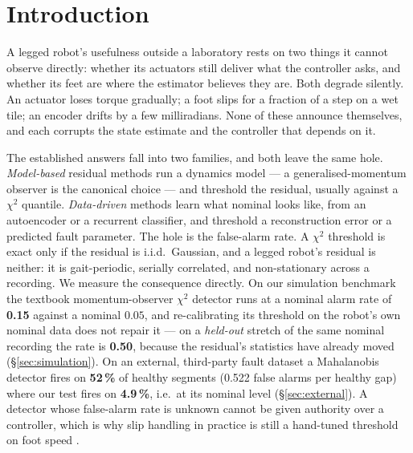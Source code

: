 \section{Introduction}
\label{sec:intro}

A legged robot's usefulness outside a laboratory rests on two things it cannot observe directly: whether its actuators
still deliver what the controller asks, and whether its feet are where the estimator believes they are. Both degrade
silently. An actuator loses torque gradually; a foot slips for a fraction of a step on a wet tile; an encoder drifts by
a few milliradians. None of these announce themselves, and each corrupts the state estimate and the controller that
depends on it.



The established answers fall into two families, and both leave the same hole. \emph{Model-based} residual methods run a
dynamics model --- a generalised-momentum observer is the canonical choice
\cite{deluca2003actuator,haddadin2017robot} --- and threshold the residual, usually against a $\chi^2$ quantile.
\emph{Data-driven} methods learn what nominal looks like, from an autoencoder or a recurrent classifier, and threshold a
reconstruction error or a predicted fault parameter. The hole is the false-alarm rate. A $\chi^2$ threshold is exact
only if the residual is i.i.d.\ Gaussian, and a legged robot's residual is neither: it is gait-periodic, serially
correlated, and non-stationary across a recording. We measure the consequence directly. On our simulation benchmark the
textbook momentum-observer $\chi^2$ detector runs at a nominal alarm rate of \textbf{0.15} against a nominal $0.05$, and
re-calibrating its threshold on the robot's own nominal data does not repair it --- on a \emph{held-out} stretch of the
same nominal recording the rate is \textbf{0.50}, because the residual's statistics have already moved
(\S\ref{sec:simulation}). On an external, third-party fault dataset a Mahalanobis detector fires on \textbf{52\,\%} of
healthy segments (0.522 false alarms per healthy gap) where our test fires on \textbf{4.9\,\%}, i.e.\ at its nominal
level (\S\ref{sec:external}). A detector whose false-alarm rate is unknown cannot be given authority over a controller,
which is why slip handling in practice is still a hand-tuned threshold on foot speed \cite{jenelten2019slippery}.

